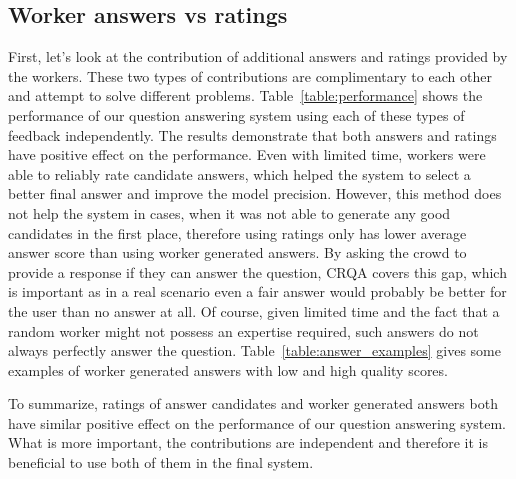 \documentclass[letterpaper]{article}
\begin{document}
\subsection{Worker answers vs ratings}
\label{sec:analysis:answers_vs_ratings}

First, let's look at the contribution of additional answers and ratings provided by the workers.
These two types of contributions are complimentary to each other and attempt to solve different problems.
Table~\ref{table:performance} shows the performance of our question answering system using each of these types of feedback independently.
The results demonstrate that both answers and ratings have positive effect on the performance.
Even with limited time, workers were able to reliably rate candidate answers, which helped the system to select a better final answer and improve the model precision.
However, this method does not help the system in cases, when it was not able to generate any good candidates in the first place, therefore using ratings only has lower average answer score than using worker generated answers.
By asking the crowd to provide a response if they can answer the question, CRQA covers this gap, which is important as in a real scenario even a fair answer would probably be better for the user than no answer at all.
Of course, given limited time and the fact that a random worker might not possess an expertise required, such answers do not always perfectly answer the question.
Table~\ref{table:answer_examples} gives some examples of worker generated answers with low and high quality scores.

To summarize, ratings of answer candidates and worker generated answers both have similar positive effect on the performance of our question answering system.
What is more important, the contributions are independent and therefore it is beneficial to use both of them in the final system.
\end{document}
